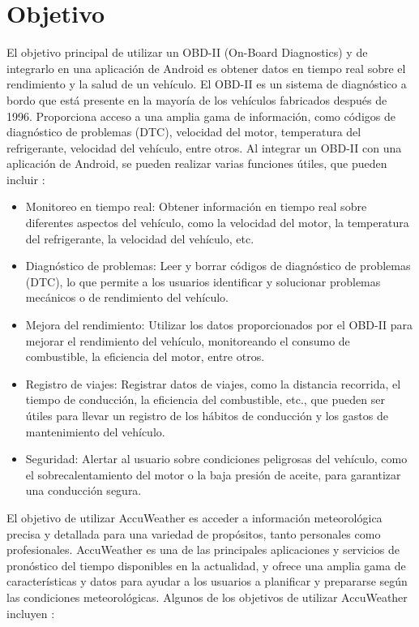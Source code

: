 \documentclass[a4paper,10pt, oneside, titlepage]{article}
\begin{document}
	\section{Objetivo}\label{Etiqueta_Objetivo}
	El objetivo principal de utilizar un OBD-II (On-Board Diagnostics) y de integrarlo en una aplicación de Android es obtener datos en tiempo real sobre el rendimiento y la salud de un vehículo. El OBD-II es un sistema de diagnóstico a bordo que está presente en la mayoría de los vehículos fabricados después de 1996. Proporciona acceso a una amplia gama de información, como códigos de diagnóstico de problemas (DTC), velocidad del motor, temperatura del refrigerante, velocidad del vehículo, entre otros. Al integrar un OBD-II con una aplicación de Android, se pueden realizar varias funciones útiles, que pueden incluir \cite{GeoTab}:
	\begin{itemize}
		\item Monitoreo en tiempo real: Obtener información en tiempo real sobre diferentes aspectos del vehículo, como la velocidad del motor, la temperatura del refrigerante, la velocidad del vehículo, etc.
		\item Diagnóstico de problemas: Leer y borrar códigos de diagnóstico de problemas (DTC), lo que permite a los usuarios identificar y solucionar problemas mecánicos o de rendimiento del vehículo.
		\item Mejora del rendimiento: Utilizar los datos proporcionados por el OBD-II para mejorar el rendimiento del vehículo, monitoreando el consumo de combustible, la eficiencia del motor, entre otros.
		\item Registro de viajes: Registrar datos de viajes, como la distancia recorrida, el tiempo de conducción, la eficiencia del combustible, etc., que pueden ser útiles para llevar un registro de los hábitos de conducción y los gastos de mantenimiento del vehículo.
		\item Seguridad: Alertar al usuario sobre condiciones peligrosas del vehículo, como el sobrecalentamiento del motor o la baja presión de aceite, para garantizar una conducción segura.
	\end{itemize}
	\indent El objetivo de utilizar AccuWeather es acceder a información meteorológica precisa y detallada para una variedad de propósitos, tanto personales como profesionales. AccuWeather es una de las principales aplicaciones y servicios de pronóstico del tiempo disponibles en la actualidad, y ofrece una amplia gama de características y datos para ayudar a los usuarios a planificar y prepararse según las condiciones meteorológicas. Algunos de los objetivos de utilizar AccuWeather incluyen \cite{AccuWeather}:
\end{document}
